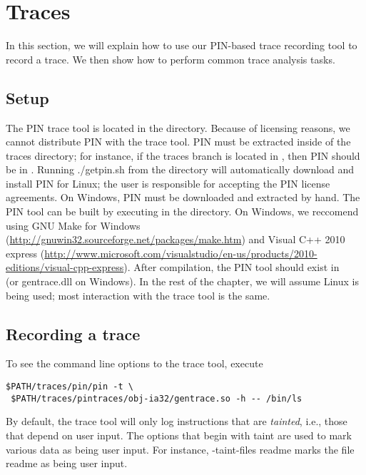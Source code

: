 \section{Traces}

In this section, we will explain how to use our PIN-based trace
recording tool to record a trace.  We then show how to perform common
trace analysis tasks.

\subsection{Setup}

The PIN trace tool is located in the 
directory.  Because of licensing reasons, we cannot distribute PIN
with the trace tool.  PIN must be extracted inside of the traces
directory; for instance, if the traces branch is located in
, then PIN should be in
.  Running ./getpin.sh from the
 directory will automatically
download and install PIN for Linux; the user is responsible for
accepting the PIN license agreements.  On Windows, PIN must be
downloaded and extracted by hand.  The PIN tool can be built by
executing  in the 
directory.  On Windows, we reccomend using GNU Make for Windows
(\url{http://gnuwin32.sourceforge.net/packages/make.htm}) and Visual
C++ 2010 express
(\url{http://www.microsoft.com/visualstudio/en-us/products/2010-editions/visual-cpp-express}).
After compilation, the PIN tool should exist in \\
 (or
gentrace.dll on Windows).  In the rest of the chapter, we will assume
Linux is being used; most interaction with the trace tool is the same.

\subsection{Recording a trace}

To see the command line options to the trace tool, execute 

\begin{verbatim} 
$PATH/traces/pin/pin -t \
 $PATH/traces/pintraces/obj-ia32/gentrace.so -h -- /bin/ls
\end{verbatim}

By default, the trace tool will only log instructions that are
\emph{tainted}, i.e., those that depend on user input.  The options
that begin with taint are used to mark various data
as being user input.  For instance, -taint-files readme marks the file
readme as being user input.

